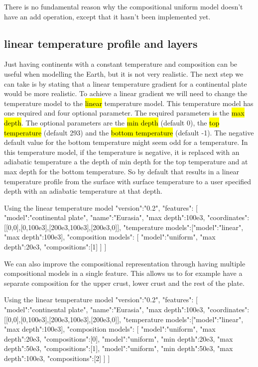 \documentclass{book}
\begin{document}
\begin{remark}
There is no fundamental reason why the compositional uniform model doesn't have an add operation, except that it hasn't been implemented yet.
\end{remark}

\subsection{linear temperature profile and layers}
Just having continents with a constant temperature and composition can be useful when modelling the Earth, but it is not very realistic. The next step we can take is by stating that a linear temperature gradient for a continental plate would be more realistic. To achieve a linear gradient we will need to change the temperature model to the \hl{linear} temperature model. This temperature model has one required and four optional parameter. The required parameters is the \hl{max depth}. The optional parameters are the \hl{min depth} (default 0), the \hl{top temperature} (default 293) and the \hl{bottom temperature} (default -1). The negative default value for the bottom temperature might seem odd for a temperature. In this temperature model, if the temperature is negative, it is replaced with an adiabatic temperature a the depth of min depth for the top temperature and at max depth for the bottom temperature. So by default that results in a linear temperature profile from the surface with surface temperature to a user specified depth with an adiabatic temperature at that depth.

\begin{javascriptcode}{Using the linear temperature model}{}
{
  "version":"0.2",
  "features":
  [
    {
      "model":"continental plate", "name":"Eurasia", "max depth":100e3,
      "coordinates":[[0,0],[0,100e3],[200e3,100e3],[200e3,0]],
      "temperature models":[{"model":"linear", "max depth":100e3}],
      "composition models":
      [
        {"model":"uniform", "max depth":20e3, "compositions":[1]}
      ]
    }
  ]
}
\end{javascriptcode}

We can also improve the compositional representation through having multiple compositional models in a single feature. This allows us to for example have a separate composition for the upper crust, lower crust and the rest of the plate.

\begin{javascriptcode}{Using the linear temperature model}{}
{
  "version":"0.2",
  "features":
  [
    {
      "model":"continental plate", "name":"Eurasia", "max depth":100e3,
      "coordinates":[[0,0],[0,100e3],[200e3,100e3],[200e3,0]],
      "temperature models":[{"model":"linear", "max depth":100e3}],
      "composition models":
      [
        {"model":"uniform", "max depth":20e3, "compositions":[0]},
        {"model":"uniform", "min depth":20e3, "max depth":50e3, "compositions":[1]},
        {"model":"uniform", "min depth":50e3, "max depth":100e3, "compositions":[2]}
      ]
    }
  ]
}
\end{javascriptcode}
\end{document}
